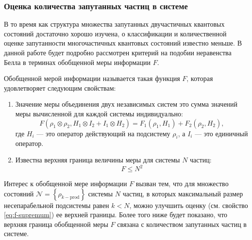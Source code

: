 \subsubsection{Оценка количества запутанных частиц в системе}
В то время как структура множества запутанных двучастичных квантовых состояний достаточно хорошо изучена, 
о классификации и количественной оценке запутанности многочастичных квантовых состояний известно меньше\cite{Plenio2007, Amico2008, Horodecki2009, Guhne2009}. 
%
В данной работе будет подробно рассмотрен критерий на подобии неравенства Белла\cite{Bell1964} в терминах обобщенной меры информации $F$. 

\begin{definition}\label{def:f} 
Обобщенной мерой информации называется такая функция $F$, 
которая удовлетворяет следующим свойствам: 
\begin{enumerate}
  \item Значение меры объединения двух независимых систем это сумма значений меры вычисленной для каждой системы индивидуально:  
  \begin{equation}\label{eq:f-additive-map}
    F(\rho_1 \otimes \rho_2 ,H_1 \otimes I_2 + I_1 \otimes H_2) 
    = F_{1} (\rho_1, H_1) + F_{2} (\rho_2 , H_2), 
  \end{equation}
  где $H_i$ --- это оператор действующий на подсистему $\rho_i$, 
  а $I_i$ --- это единичный оператор. 
  
  \item Известна верхняя граница величины меры для системы $N$ частиц:
  \begin{equation}\label{eq:f-supremum}
    F \leq N^2
  \end{equation}
\end{enumerate}
\end{definition}

Интерес к обобщенной мере информации $F$ вызван тем,
что для множество состояний $\mathcal{N} = \left\{\rho_{k-\mathrm{prod}}\right\}$ системы $N$ частиц, 
в которых максимальный размер несепарабельной подсистемы равен $k < N$, 
можно улучшить оценку (см. свойство \ref{eq:f-supremum}) ее верхней границы.
Более того ниже будет показано, 
что верхняя граница обобщенной меры $F$ связана с количеством запутанных частиц в системе. 

